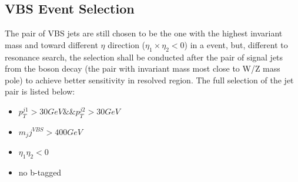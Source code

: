 \subsection{VBS Event Selection}
The pair of VBS jets are still chosen to be the one with the highest invariant mass and toward different $\eta$ direction ($\eta_1\times\eta_2<0$) in a event, but, different to resonance search, the selection shall be conducted after the pair of signal jets from the boson decay (the pair with invariant mass most close to W/Z mass pole) to achieve better sensitivity in resolved region. The full selection of the jet pair is listed below:
\begin{itemize}
	\item $p_{T}^{j1}>30GeV\&\&p_{T}^{j2}>30GeV$
	\item $m_jj^{VBS}>400GeV$
	\item $\eta_1\eta_2<0$
	\item no b-tagged
\end{itemize}
